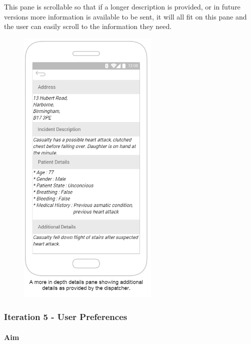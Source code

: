 \documentclass{article}
\begin{document}
This pane is scrollable so that if a longer description is provided, or in future versions more information is available to be sent, it will all fit on this pane and the user can easily scroll to the information they need.\\

	\begin{figure}[H]
		\centering
		\vspace{-20pt}
		\includegraphics[width=0.6\textwidth]{"Iteration4/Additional Details - 2"}
	\end{figure}
	
	
\pagebreak
		\subsubsection{Iteration 5 - User Preferences}
		\paragraph{Aim}
\end{document}
